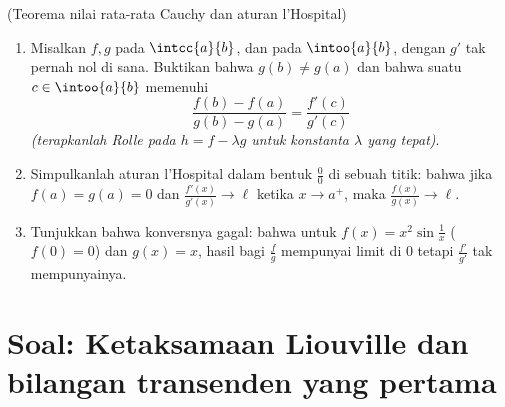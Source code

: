 \begin{exercise}[$\star\star\star$]\label{exo:b1:derivative:12}
(Teorema nilai rata-rata Cauchy dan aturan l'Hospital)
\begin{enumerate}
  \item Misalkan $f, g$  pada $\intcc{a}{b}$, dan
         pada $\intoo{a}{b}$, dengan $g'$ tak pernah nol
        di sana. Buktikan bahwa $g(b) \neq g(a)$ dan bahwa suatu $c \in
        \intoo{a}{b}$ memenuhi
        \[
        \frac{f(b) - f(a)}{g(b) - g(a)} = \frac{f'(c)}{g'(c)}
        \]
        \emph{(terapkanlah Rolle pada $h = f - \lambda g$ untuk konstanta
        $\lambda$ yang tepat)}.
  \item Simpulkanlah aturan l'Hospital dalam bentuk $\frac00$ di sebuah
        titik: bahwa jika $f(a) = g(a) = 0$ dan
        $\frac{f'(x)}{g'(x)} \to \ell$ ketika $x \to a^+$, maka
        $\frac{f(x)}{g(x)} \to \ell$.
  \item Tunjukkan bahwa konversnya gagal: bahwa untuk $f(x) = x^2\sin\frac1x$
        ($f(0) = 0$) dan $g(x) = x$, hasil bagi
        $\frac{f}{g}$ mempunyai limit di $0$ tetapi
        $\frac{f'}{g'}$ tak mempunyainya.
\end{enumerate}
\end{exercise}

\section{Soal: Ketaksamaan Liouville dan bilangan transenden yang
pertama}

